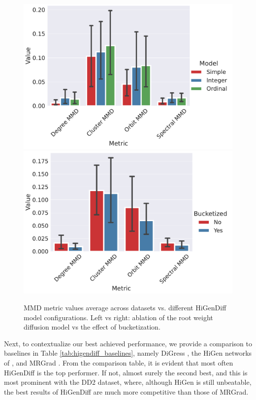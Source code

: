 \begin{figure}[H]
    \centering
    \includegraphics[width=0.475\linewidth]{figures/higendiff/ablation_model.pdf}
    \includegraphics[width=0.475\linewidth]{figures/higendiff/ablation_bucketized.pdf}
    \caption[MMD metric values vs. different HiGenDiff model configurations.]{MMD metric values average across datasets vs. different HiGenDiff model configurations. Left vs right: ablation of the root weight diffusion model vs the effect of bucketization.}
    \label{fig:higendiff_ablation}
\end{figure}

Next, to contextualize our best achieved performance, we provide a comparison to baselines in Table \ref{tab:higendiff_baselines}, namely DiGress \cite{vignac_digress_2022}, the HiGen networks of \cite{karami_higen_2024}, and MRGrad \cite{karami_multi-resolution_2024}. From the comparison table, it is evident that most often HiGenDiff is the top performer. If not, almost surely the second best, and this is most prominent with the DD2 dataset, where, although HiGen is still unbeatable, the best results of HiGenDiff are much more competitive than those of MRGrad. 

